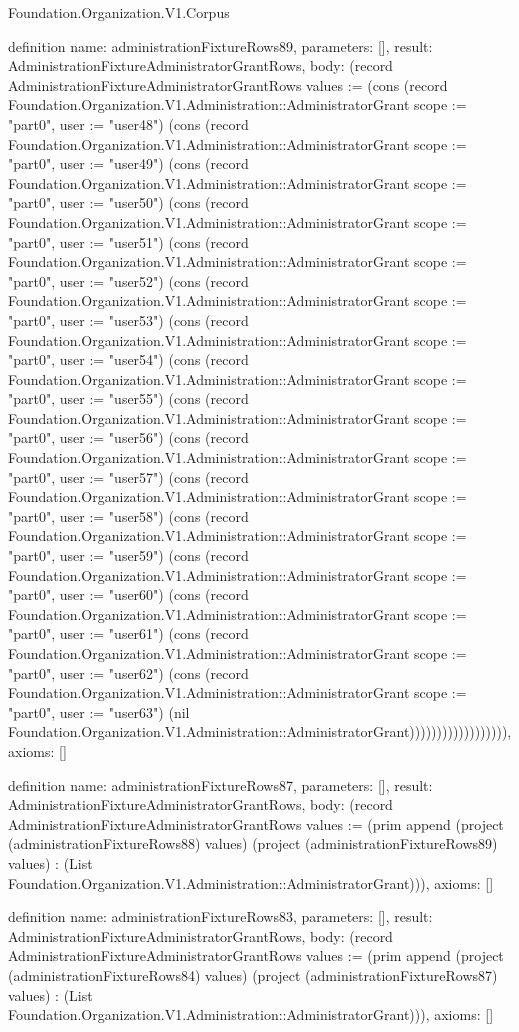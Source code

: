 \begin{lexlean}{Foundation.Organization.V1.Corpus}
\begin{semanticmodule}
definition{
  name: administrationFixtureRows89,
  parameters: [],
  result: AdministrationFixtureAdministratorGrantRows,
  body: (record AdministrationFixtureAdministratorGrantRows {values := (cons (record Foundation.Organization.V1.Administration::AdministratorGrant {scope := "part0", user := "user48"}) (cons (record Foundation.Organization.V1.Administration::AdministratorGrant {scope := "part0", user := "user49"}) (cons (record Foundation.Organization.V1.Administration::AdministratorGrant {scope := "part0", user := "user50"}) (cons (record Foundation.Organization.V1.Administration::AdministratorGrant {scope := "part0", user := "user51"}) (cons (record Foundation.Organization.V1.Administration::AdministratorGrant {scope := "part0", user := "user52"}) (cons (record Foundation.Organization.V1.Administration::AdministratorGrant {scope := "part0", user := "user53"}) (cons (record Foundation.Organization.V1.Administration::AdministratorGrant {scope := "part0", user := "user54"}) (cons (record Foundation.Organization.V1.Administration::AdministratorGrant {scope := "part0", user := "user55"}) (cons (record Foundation.Organization.V1.Administration::AdministratorGrant {scope := "part0", user := "user56"}) (cons (record Foundation.Organization.V1.Administration::AdministratorGrant {scope := "part0", user := "user57"}) (cons (record Foundation.Organization.V1.Administration::AdministratorGrant {scope := "part0", user := "user58"}) (cons (record Foundation.Organization.V1.Administration::AdministratorGrant {scope := "part0", user := "user59"}) (cons (record Foundation.Organization.V1.Administration::AdministratorGrant {scope := "part0", user := "user60"}) (cons (record Foundation.Organization.V1.Administration::AdministratorGrant {scope := "part0", user := "user61"}) (cons (record Foundation.Organization.V1.Administration::AdministratorGrant {scope := "part0", user := "user62"}) (cons (record Foundation.Organization.V1.Administration::AdministratorGrant {scope := "part0", user := "user63"}) (nil Foundation.Organization.V1.Administration::AdministratorGrant)))))))))))))))))}),
  axioms: []
}

definition{
  name: administrationFixtureRows87,
  parameters: [],
  result: AdministrationFixtureAdministratorGrantRows,
  body: (record AdministrationFixtureAdministratorGrantRows {values := (prim append (project (administrationFixtureRows88) values) (project (administrationFixtureRows89) values) : (List Foundation.Organization.V1.Administration::AdministratorGrant))}),
  axioms: []
}

definition{
  name: administrationFixtureRows83,
  parameters: [],
  result: AdministrationFixtureAdministratorGrantRows,
  body: (record AdministrationFixtureAdministratorGrantRows {values := (prim append (project (administrationFixtureRows84) values) (project (administrationFixtureRows87) values) : (List Foundation.Organization.V1.Administration::AdministratorGrant))}),
  axioms: []
}


\end{semanticmodule}
\end{lexlean}
